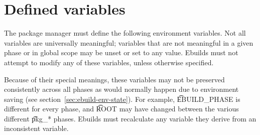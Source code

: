 \section{Defined variables}
\label{sec:ebuild-env-vars}

The package manager must define the following environment variables. Not all variables are
universally meaningful; variables that are not meaningful in a given phase or in global scope may
be unset or set to any value. Ebuilds must not attempt to modify any of these variables, unless
otherwise specified.

Because of their special meanings, these variables may not be preserved consistently across all
phases as would normally happen due to environment saving (see section~\ref{sec:ebuild-env-state}).
For example, \t{EBUILD_PHASE} is different for every phase, and \t{ROOT} may have changed between
the various different \t{pkg_*} phases. Ebuilds must recalculate any variable they derive from an
inconsistent variable.

